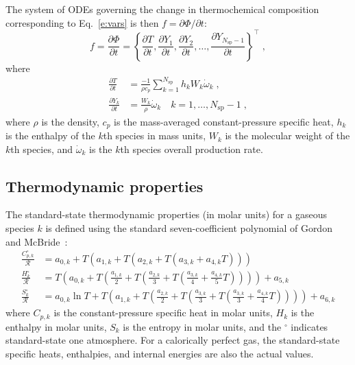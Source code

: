 \documentclass[preprint,12pt]{elsarticle}
\newcommand{ \ddt } [1] { \frac{ \partial #1 }{ \partial t } }
\newcommand{ \numsp }{N_{\text{sp}}}
\begin{document}
The system of ODEs governing the change in thermochemical composition corresponding to Eq.~\eqref{e:vars} is then $ f = \partial \Phi/ \partial t$:
\begin{equation}
f = \ddt{\Phi} = \left \lbrace \ddt{T}, \ddt{Y_1}, \ddt{Y_2}, \dotsc, \ddt{Y_{\numsp - 1}} \right\rbrace^{\intercal} \;,
\label{e:ode}
\end{equation}
where
\begin{align}
\ddt{T} &= \frac{-1}{\rho c_p} \sum_{k=1}^{\numsp} h_k W_k \dot{\omega}_k \;, \\
\ddt{Y_k} &= \frac{W_k}{\rho} \dot{\omega}_k \quad k = 1, \dotsc, \numsp - 1 \;, \label{e:dTdt}
\end{align}
where $\rho$ is the density, $c_p$ is the mass-averaged constant-pressure specific heat, $h_k$ is the enthalpy of the $k$th species in mass units, $W_k$ is the molecular weight of the $k$th species, and $\dot{\omega}_k$ is the $k$th species overall production rate.

\subsection{Thermodynamic properties}

The standard-state thermodynamic properties (in molar units) for a gaseous species $k$ is defined using the standard seven-coefficient polynomial of Gordon and McBride~\cite{Gordon:1976wp}:
\begin{align}
\frac{C_{p,k}^{\circ}}{\mathcal{R}} &= a_{0,k} + T \left( a_{1,k} + T \left( a_{2,k} + T \left( a_{3,k} + a_{4,k} T \right) \right) \right) \label{e:cpk} \\
\frac{H_k^{\circ}}{\mathcal{R}} &= T \left( a_{0,k} + T \left( \frac{a_{1,k}}{2} + T \left( \frac{a_{2,k}}{3} + T \left( \frac{a_{3,k}}{4} + \frac{a_{4,k}}{5} T \right) \right) \right) \right) + a_{5,k} \label{e:hk} \\
\frac{S_k^{\circ}}{\mathcal{R}} &= a_{0,k} \ln T + T \left( a_{1,k} + T \left( \frac{a_{2,k}}{2} + T \left( \frac{a_{3,k}}{3} + T \left( \frac{a_{3,k}}{3} + \frac{a_{4,k}}{4} T \right) \right) \right) \right) + a_{6,k} \label{e:sk}
\end{align}
where $C_{p,k}$ is the constant-pressure specific heat in molar units, $H_k$ is the enthalpy in molar units, $S_k$ is the entropy in molar units, and the ${}^{\circ}$ indicates standard-state one atmosphere.
For a calorically perfect gas, the standard-state specific heats, enthalpies, and internal energies are also the actual values.
\end{document}
